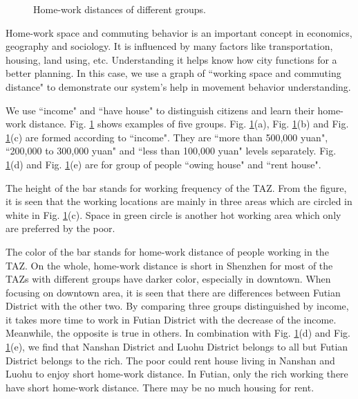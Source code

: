 \begin{figure}
\hspace{5pt}
\caption{Home-work distances of different groups.}
\label{case2}
\end{figure}
Home-work space and commuting behavior is an important concept in economics, geography and sociology. It is influenced by many factors like transportation, housing, land using, etc. Understanding it helps know how city functions for a better planning. In this case, we use a graph of ``working space and commuting distance" to demonstrate our system's help in movement behavior understanding.

We use ``income" and ``have house" to distinguish citizens and learn their home-work distance. Fig. \ref{case2} shows examples of five groups. Fig. \ref{case2}(a), Fig. \ref{case2}(b) and Fig. \ref{case2}(c) are formed according to ``income". They are ``more than 500,000 yuan", ``200,000 to 300,000 yuan" and ``less than 100,000 yuan" levels separately. Fig. \ref{case2}(d) and Fig. \ref{case2}(e) are for group of people ``owing house" and ``rent house".

The height of the bar stands for working frequency of the TAZ. From the figure, it is seen that the working locations are mainly in three areas which are circled in white in Fig. \ref{case2}(c). Space in green circle is another hot working area which only are preferred by the poor.

The color of the bar stands for home-work distance of people working in the TAZ. On the whole, home-work distance is short in Shenzhen for most of the TAZs with different groups have darker color, especially in downtown. When focusing on downtown area, it is seen that there are differences between Futian District with the other two. By comparing three groups distinguished by income, it takes more time to work in Futian District with the decrease of the income. Meanwhile, the opposite is true in others. In combination with Fig. \ref{case2}(d) and Fig. \ref{case2}(e), we find that Nanshan District and Luohu District belongs to all but Futian District belongs to the rich. The poor could rent house living in Nanshan and Luohu to enjoy short home-work distance. In Futian, only the rich working there have short home-work distance. There may be no much housing for rent.


